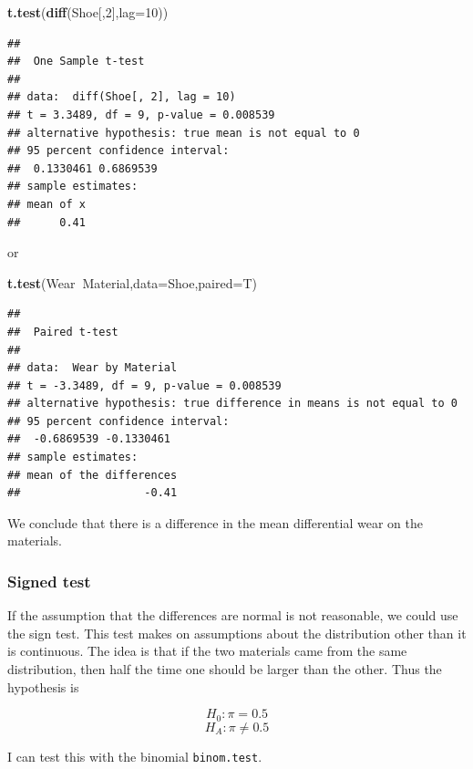 \documentclass[]{book}
\newenvironment{Shaded}{\begin{snugshade}}{\end{snugshade}}
\newcommand{\KeywordTok}[1]{\textcolor[rgb]{0.13,0.29,0.53}{\textbf{#1}}}
\newcommand{\DataTypeTok}[1]{\textcolor[rgb]{0.13,0.29,0.53}{#1}}
\newcommand{\DecValTok}[1]{\textcolor[rgb]{0.00,0.00,0.81}{#1}}
\newcommand{\OperatorTok}[1]{\textcolor[rgb]{0.81,0.36,0.00}{\textbf{#1}}}
\newcommand{\NormalTok}[1]{#1}
\theoremstyle{definition}
\theoremstyle{definition}
\theoremstyle{definition}
\theoremstyle{remark}
\begin{document}
\begin{Shaded}
\begin{Highlighting}[]
\KeywordTok{t.test}\NormalTok{(}\KeywordTok{diff}\NormalTok{(Shoe[,}\DecValTok{2}\NormalTok{],}\DataTypeTok{lag=}\DecValTok{10}\NormalTok{))}
\end{Highlighting}
\end{Shaded}

\begin{verbatim}
## 
##  One Sample t-test
## 
## data:  diff(Shoe[, 2], lag = 10)
## t = 3.3489, df = 9, p-value = 0.008539
## alternative hypothesis: true mean is not equal to 0
## 95 percent confidence interval:
##  0.1330461 0.6869539
## sample estimates:
## mean of x 
##      0.41
\end{verbatim}

or

\begin{Shaded}
\begin{Highlighting}[]
\KeywordTok{t.test}\NormalTok{(Wear}\OperatorTok{~}\NormalTok{Material,}\DataTypeTok{data=}\NormalTok{Shoe,}\DataTypeTok{paired=}\NormalTok{T)}
\end{Highlighting}
\end{Shaded}

\begin{verbatim}
## 
##  Paired t-test
## 
## data:  Wear by Material
## t = -3.3489, df = 9, p-value = 0.008539
## alternative hypothesis: true difference in means is not equal to 0
## 95 percent confidence interval:
##  -0.6869539 -0.1330461
## sample estimates:
## mean of the differences 
##                   -0.41
\end{verbatim}

We conclude that there is a difference in the mean differential wear on
the materials.

\subsubsection{Signed test}\label{signed-test}

If the assumption that the differences are normal is not reasonable, we
could use the sign test. This test makes on assumptions about the
distribution other than it is continuous. The idea is that if the two
materials came from the same distribution, then half the time one should
be larger than the other. Thus the hypothesis is

\[H_{0}: \pi = 0.5\] \[H_{A}: \pi \neq 0.5\]

I can test this with the binomial \texttt{binom.test}.
\end{document}
